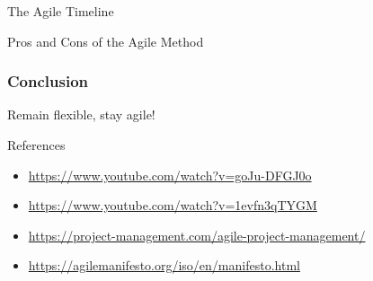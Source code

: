 \documentclass[10pt]{beamer}
\begin{document}
\begin{frame}{The Agile Timeline}
\end{frame}

\begin{frame}{Pros and Cons of the Agile Method}
\end{frame}

\begin{frame}[plain]
  \frametitle{Conclusion}
  \begin{center}
      \Huge Remain flexible, stay agile!
  \end{center}
\end{frame}

\begin{frame}{References}
  \begin{itemize}
    \item \href{https://www.youtube.com/watch?v=goJu-DFGJ0o}{https://www.youtube.com/watch?v=goJu-DFGJ0o}
    \item \href{https://www.youtube.com/watch?v=1evfn3qTYGM}{https://www.youtube.com/watch?v=1evfn3qTYGM}
    \item \href{https://project-management.com/agile-project-management/}{https://project-management.com/agile-project-management/}
    \item \href{https://agilemanifesto.org/iso/en/manifesto.html}{https://agilemanifesto.org/iso/en/manifesto.html}
  \end{itemize}
\end{frame}
\end{document}
